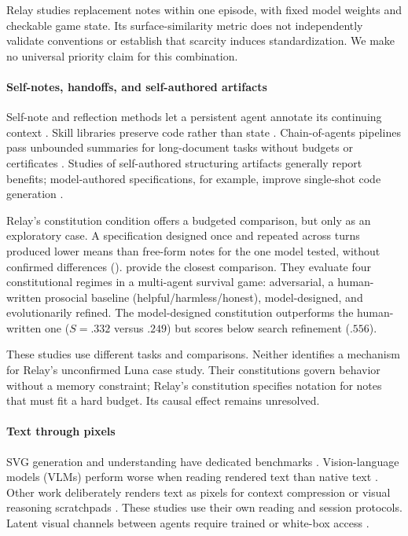 Relay studies replacement notes within one episode, with fixed model weights and checkable game state. Its surface-similarity metric does not independently validate conventions or establish that scarcity induces standardization. We make no universal priority claim for this combination.

\paragraph{Self-notes, handoffs, and self-authored artifacts}
Self-note and reflection methods let a persistent agent annotate its continuing context \citep{selfnotes2023,reflexion2023,expel2023,voyager2023,sleeptime2025}. Skill libraries preserve code rather than state \citep{voyager2023}. Chain-of-agents pipelines pass unbounded summaries for long-document tasks without budgets or certificates \citep{chainofagents2024}. Studies of self-authored structuring artifacts generally report benefits; model-authored specifications, for example, improve single-shot code generation \citep{selfspec2025}.

Relay's constitution condition offers a budgeted comparison, but only as an exploratory case. A specification designed once and repeated across turns produced lower means than free-form notes for the one model tested, without confirmed differences (). \citet{constitutions2026} provide the closest comparison. They evaluate four constitutional regimes in a multi-agent survival game: adversarial, a human-written prosocial baseline (helpful/harmless/honest), model-designed, and evolutionarily refined. The model-designed constitution outperforms the human-written one ($S{=}.332$ versus $.249$) but scores below search refinement ($.556$).

These studies use different tasks and comparisons. Neither identifies a mechanism for Relay's unconfirmed Luna case study. Their constitutions govern behavior without a memory constraint; Relay's constitution specifies notation for notes that must fit a hard budget. Its causal effect remains unresolved.

\paragraph{Text through pixels}
SVG generation and understanding have dedicated benchmarks \citep{svgenius2025}. Vision-language models (VLMs) perform worse when reading rendered text than native text \citep{vistabench2026,readingnotthinking2026}. Other work deliberately renders text as pixels for context compression \citep{glyph2025,deepseekocr2025} or visual reasoning scratchpads \citep{renderofthought2026,opticalreasoning2026}. These studies use their own reading and session protocols. Latent visual channels between agents require trained or white-box access \citep{visionwormhole2026,hylat2026}.

